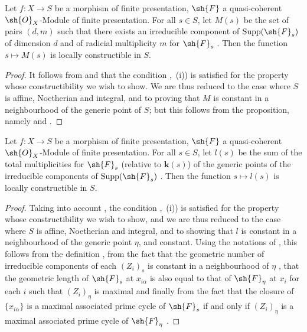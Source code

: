 \begin{corollary}[9.8.7]
\label{IV.9.8.7}
Let $f:X\to S$ be a morphism of finite presentation, $\sh{F}$ a quasi-coherent $\sh{O}_X$-Module of finite presentation.
For all $s\in S$, let $M(s)$ be the set of pairs $(d,m)$ such that there exists an irreducible component of $\operatorname{Supp}(\sh{F}_s)$ of dimension $d$ and of radicial multiplicity $m$ for $\sh{F}_s$ .
Then the function $s\mapsto M(s)$ is locally constructible in $S$.
\end{corollary}

\begin{proof}
\label{IV.9.8.7-proof}
It follows from  and  that the condition ,~(i)) is satisfied for the property whose constructibility we wish to show.
We are thus reduced to the case where $S$ is affine, Noetherian and integral, and to proving that $M$ is constant in a neighbourhood of the generic point of $S$; but this follows from the proposition, namely  and .
\end{proof}

\begin{proposition}[9.8.8]
\label{IV.9.8.8}
Let $f:X\to S$ be a morphism of finite presentation, $\sh{F}$ a quasi-coherent $\sh{O}_X$-Module of finite presentation.
For all $s\in S$, let $l(s)$ be the sum of the total multiplicities for $\sh{F}_s$ (relative to $\mathbf{k}(s)$) of the generic points of the irreducible components of $\operatorname{Supp}(\sh{F}_s)$ .
Then the function $s\mapsto l(s)$ is locally constructible in $S$.
\end{proposition}

\begin{proof}
\label{IV.9.8.8-proof}
Taking into account , the condition ,~(i)) is satisfied for the property whose constructibility we wish to show, and we are thus reduced to the case where $S$ is affine, Noetherian and integral, and to showing that $l$ is constant in a neighbourhood of the generic point $\eta$, and constant.
Using the notations of , this follows from the definition , from the fact that the geometric number of irreducible components of each $(Z_i)_s$ is constant in a neighbourhood of $\eta$ , that the geometric length of $\sh{F}_s$ at $x_{i\alpha}$ is also equal to that of $\sh{F}_\eta$ at $x_i$ for each $i$ such that $(Z_i)_\eta$ is maximal  and finally from the fact that the closure of $\{x_{i\alpha}\}$ is a maximal associated prime cycle of $\sh{F}_s$ if and only if $(Z_i)_\eta$ is a maximal associated prime cycle of $\sh{F}_\eta$ .
\end{proof}

